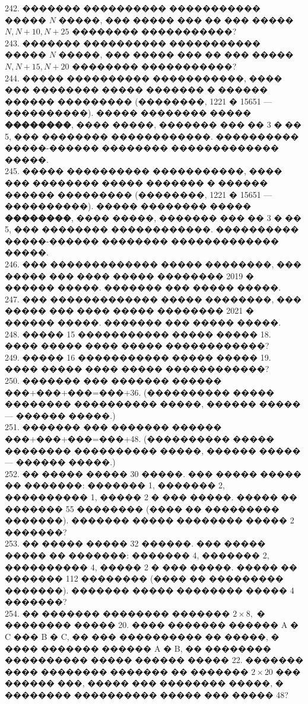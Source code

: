 \documentclass[12pt]{article}
\begin{document}
242. ������� ���������� ����������� ����� $N$ �����, ��� ����� ��� �� ��� ����� $N, N+10, N+25$ �������� �����������?\\
243. ������� ���������� ����������� ����� $N$ �����, ��� ����� ��� �� ��� ����� $N, N+15, N+20$ �������� �����������?\\
244. ����� ���������� �����������, ���� ��� �������� ����� ������� � ������ ������ ��������� (��������, 1221 � 15651 --- ����������). ����� �������� ����� {\bf ��������}, ���� �����, ������� ��� �� 3 � �� 5, ��� �������� ������������. ���������� �����-������ �������� ������������� �����.\\
245. ����� ���������� �����������, ���� ��� �������� ����� ������� � ������ ������ ��������� (��������, 1221 � 15651 --- ����������). ����� �������� ����� {\bf ��������}, ���� �����, ������� ��� �� 3 � �� 5, ��� �������� ������������. ���������� �����-������ �������� ������������� �����.\\
246. ��� ������������� ����� ��������, ��� ����� ��� ���� ����� �������� 2019 � ������ �����. ������� ��� ����� �����.\\
247. ��� ������������� ����� ��������, ��� ����� ��� ���� ����� �������� 2021 � ������ �����. ������� ��� ����� �����.\\
248. ����� 15 ����������� ����� ����� 18. ���� ����� ���� ����� ������������?\\
249. ����� 16 ����������� ����� ����� 19. ���� ����� ���� ����� ������������?\\
250. ������� ��� ������� ������ ���+���+���=���+36. (���������� ����� �������� ���������� �����, ������ ����� --- ������ �����.)\\
251. ������� ��� ������� ������ ���+���+���=���+48. (���������� ����� �������� ���������� �����, ������ ����� --- ������ �����.)\\
252. �� ����� ����� 30 �����. ��� ����� ����� �� �������: ������� 1, ������� 2, ���������� 1, ����� 2 � ��� �����. ����� �� ������� 55 �������� (���� �� ��������� �������). ������� ����� �������� ����� 2 �������?\\
253. �� ����� ����� 32 ������. ��� ����� ����� �� �������: ������� 4, ������� 2, ���������� 4, ����� 2 � ��� �����. ����� �� ������� 112 �������� (���� �� ��������� �������). ������� ����� �������� ����� 4 �������?\\
254. �� ������� �������� ������� $2\times 8,$ � �������� ����� 20. ���� ������� ������ A � C ��� B � C, �� ��� ���������� �� �����, � ���� ������� ������ A � B, �� �������� ���������� ����� ������ ����� 22. ������� ���� �������� ������� �� ������� $2\times 20$ ��� ������ ���, ����� ��� �������� �����, � �������� ���������� ����� ��� ����� 48?
\end{document}
